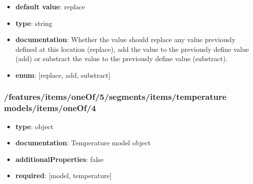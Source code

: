 \begin{itemize}\item {\bf default value}: replace
\item {\bf type}: string
\item {\bf documentation}: Whether the value should replace any value previously defined at this location (replace), add the value to the previously define value (add) or substract the value to the previously define value (substract).
\item {\bf enum}: [replace, add, substract]\end{itemize}\subsubsection{/features/items/oneOf/5/segments/items/temperature models/items/oneOf/4}
\begin{itemize}\item {\bf type}: object
\item {\bf documentation}: Temperature model object
\item {\bf additionalProperties}: false
\item {\bf required}: [model, temperature]\end{itemize}

